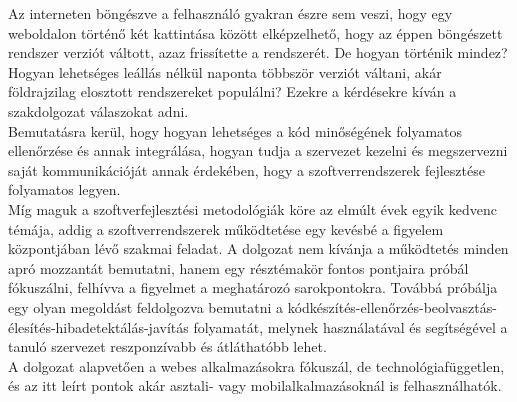 Az interneten böngészve a felhasználó gyakran észre sem veszi, hogy egy weboldalon történő két kattintása között elképzelhető, hogy az éppen böngészett rendszer verziót váltott, azaz frissítette a rendszerét. De hogyan történik mindez? Hogyan lehetséges leállás nélkül naponta többször verziót váltani, akár földrajzilag elosztott rendszereket populálni? Ezekre a kérdésekre kíván a szakdolgozat válaszokat adni.
\\
Bemutatásra kerül, hogy hogyan lehetséges a kód minőségének folyamatos ellenőrzése és annak integrálása, hogyan tudja a szervezet kezelni és megszervezni saját kommunikációját annak érdekében, hogy a szoftverrendszerek fejlesztése folyamatos legyen.
\\
Míg maguk a szoftverfejlesztési metodológiák köre az elmúlt évek egyik kedvenc témája, addig a szoftverrendszerek működtetése egy kevésbé a figyelem központjában lévő szakmai feladat. A dolgozat nem kívánja a működtetés minden apró mozzantát bemutatni, hanem egy résztémakör fontos pontjaira próbál fókuszálni, felhívva a figyelmet a meghatározó sarokpontokra. Továbbá próbálja egy olyan megoldást feldolgozva bemutatni a kódkészítés-ellenőrzés-beolvasztás-élesítés-hibadetektálás-javítás folyamatát, melynek használatával és segítségével a tanuló szervezet reszponzívabb és átláthatóbb lehet.
\\
A dolgozat alapvetően a webes alkalmazásokra fókuszál, de technológiafüggetlen, és az itt leírt pontok akár asztali- vagy mobilalkalmazásoknál is felhasználhatók.